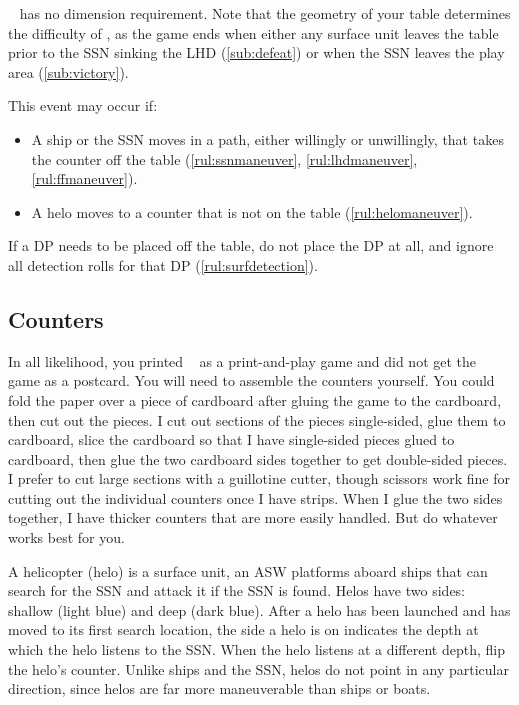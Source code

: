 \documentclass[../TacSubMicroRules.tex]{subfiles}
\begin{document}
\gametitle~ has no dimension requirement.
Note that the geometry of your table determines the difficulty of \gametitle, as the game ends when either any surface unit leaves the table prior to the SSN sinking the LHD (\ref{sub:defeat}) or when the SSN leaves the play area (\ref{sub:victory}).

 
This event may occur if:
\begin{itemize}
    \item A ship or the SSN moves in a path, either willingly or unwillingly, that takes the counter off the table (\ref{rul:ssnmaneuver}, \ref{rul:lhdmaneuver}, \ref{rul:ffmaneuver}).
    \item A helo moves to a counter that is not on the table (\ref{rul:helomaneuver}).
\end{itemize}
If a DP needs to be placed off the table, do not place the DP at all, and ignore all detection rolls for that DP (\ref{rul:surfdetection}).

\subsection{Counters}%
\label{sub:counters}


\begin{design}
    In all likelihood, you printed \gametitle~ as a print-and-play game and did not get the game as a postcard.
    You will need to assemble the counters yourself.
    You could fold the paper over a piece of cardboard after gluing the game to the cardboard, then cut out the pieces.
    I cut out sections of the pieces single-sided, glue them to cardboard, slice the cardboard so that I have single-sided pieces glued to cardboard, then glue the two cardboard sides together to get double-sided pieces.
    I prefer to cut large sections with a guillotine cutter, though scissors work fine for cutting out the individual counters once I have strips.
    When I glue the two sides together, I have thicker counters that are more easily handled.
    But do whatever works best for you.
\end{design}

 A helicopter (helo) is a surface unit, an ASW platforms aboard ships that can search for the SSN and attack it if the SSN is found.
Helos have two sides: shallow (light blue) and deep (dark blue).
After a helo has been launched and has moved to its first search location, the side a helo is on indicates the depth at which the helo listens to the SSN.
When the helo listens at a different depth, flip the helo's counter.
Unlike ships and the SSN, helos do not point in any particular direction, since helos are far more maneuverable than ships or boats.
\end{document}

